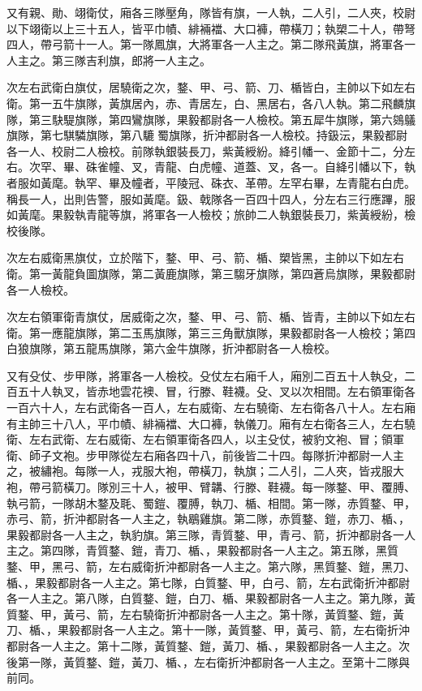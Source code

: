 \begin{pinyinscope}
 又有親、勛、翊衛仗，廂各三隊壓角，隊皆有旗，一人執，二人引，二人夾，校尉以下翊衛以上三十五人，皆平巾幘、緋裲襠、大口褲，帶橫刀；執槊二十人，帶弩四人，帶弓箭十一人。第一隊鳳旗，大將軍各一人主之。第二隊飛黃旗，將軍各一人主之。第三隊吉利旗，郎將一人主之。



 次左右武衛白旗仗，居驍衛之次，鍪、甲、弓、箭、刀、楯皆白，主帥以下如左右衛。第一五牛旗隊，黃旗居內，赤、青居左，白、黑居右，各八人執。第二飛麟旗隊，第三駃騠旗隊，第四鸞旗隊，果毅都尉各一人檢校。第五犀牛旗隊，第六鵕鸃旗隊，第七騏驎旗隊，第八騼蜀旗隊，折沖都尉各一人檢校。持鈒沄，果毅都尉各一人、校尉二人檢校。前隊執銀裝長刀，紫黃綬紛。絳引幡一、金節十二，分左右。次罕、畢、硃雀幢、叉，青龍、白虎幢、道蓋、叉，各一。自絳引幡以下，執者服如黃麾。執罕、畢及幢者，平陵冠、硃衣、革帶。左罕右畢，左青龍右白虎。稱長一人，出則告警，服如黃麾。鈒、戟隊各一百四十四人，分左右三行應蹕，服如黃麾。果毅執青龍等旗，將軍各一人檢校；旅帥二人執銀裝長刀，紫黃綬紛，檢校後隊。



 次左右威衛黑旗仗，立於階下，鍪、甲、弓、箭、楯、槊皆黑，主帥以下如左右衛。第一黃龍負圖旗隊，第二黃鹿旗隊，第三騶牙旗隊，第四蒼烏旗隊，果毅都尉各一人檢校。



 次左右領軍衛青旗仗，居威衛之次，鍪、甲、弓、箭、楯、皆青，主帥以下如左右衛。第一應龍旗隊，第二玉馬旗隊，第三三角獸旗隊，果毅都尉各一人檢校；第四白狼旗隊，第五龍馬旗隊，第六金牛旗隊，折沖都尉各一人檢校。



 又有殳仗、步甲隊，將軍各一人檢校。殳仗左右廂千人，廂別二百五十人執殳，二百五十人執叉，皆赤地雲花襖、冒，行滕、鞋襪。殳、叉以次相間。左右領軍衛各一百六十人，左右武衛各一百人，左右威衛、左右驍衛、左右衛各八十人。左右廂有主帥三十八人，平巾幘、緋裲襠、大口褲，執儀刀。廂有左右衛各三人，左右驍衛、左右武衛、左右威衛、左右領軍衛各四人，以主殳仗，被豹文袍、冒；領軍衛、師子文袍。步甲隊從左右廂各四十八，前後皆二十四。每隊折沖都尉一人主之，被繡袍。每隊一人，戎服大袍，帶橫刀，執旗；二人引，二人夾，皆戎服大袍，帶弓箭橫刀。隊別三十人，被甲、臂韝、行滕、鞋襪。每一隊鍪、甲、覆膊、執弓箭，一隊胡木鍪及毦、蜀鎧、覆膊，執刀、楯、相間。第一隊，赤質鍪、甲，赤弓、箭，折沖都尉各一人主之，執鶡雞旗。第二隊，赤質鍪、鎧，赤刀、楯、，果毅都尉各一人主之，執豹旗。第三隊，青質鍪、甲，青弓、箭，折沖都尉各一人主之。第四隊，青質鍪、鎧，青刀、楯、，果毅都尉各一人主之。第五隊，黑質鍪、甲，黑弓、箭，左右威衛折沖都尉各一人主之。第六隊，黑質鍪、鎧，黑刀、楯、，果毅都尉各一人主之。第七隊，白質鍪、甲，白弓、箭，左右武衛折沖都尉各一人主之。第八隊，白質鍪、鎧，白刀、楯、果毅都尉各一人主之。第九隊，黃質鍪、甲，黃弓、箭，左右驍衛折沖都尉各一人主之。第十隊，黃質鍪、鎧，黃刀、楯、，果毅都尉各一人主之。第十一隊，黃質鍪、甲，黃弓、箭，左右衛折沖都尉各一人主之。第十二隊，黃質鍪、鎧，黃刀、楯、，果毅都尉各一人主之。次後第一隊，黃質鍪、鎧，黃刀、楯、，左右衛折沖都尉各一人主之。至第十二隊與前同。




\end{pinyinscope}
